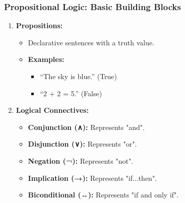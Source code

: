 \documentclass[aspectratio=169]{beamer}
\begin{document}
\begin{frame}[fragile]
    \frametitle{Propositional Logic: Basic Building Blocks}
    
    \begin{enumerate}
        \item \textbf{Propositions:}
            \begin{itemize}
                \item Declarative sentences with a truth value.
                \item \textbf{Examples:}
                    \begin{itemize}
                        \item “The sky is blue.” (True)
                        \item “2 + 2 = 5.” (False)
                    \end{itemize}
            \end{itemize}
        
        \item \textbf{Logical Connectives:}
            \begin{itemize}
                \item \textbf{Conjunction (∧):} Represents "and".
                \item \textbf{Disjunction (∨):} Represents "or".
                \item \textbf{Negation (¬):} Represents "not".
                \item \textbf{Implication (→):} Represents "if...then".
                \item \textbf{Biconditional (↔):} Represents "if and only if".
            \end{itemize}
    \end{enumerate}
\end{frame}
\end{document}
